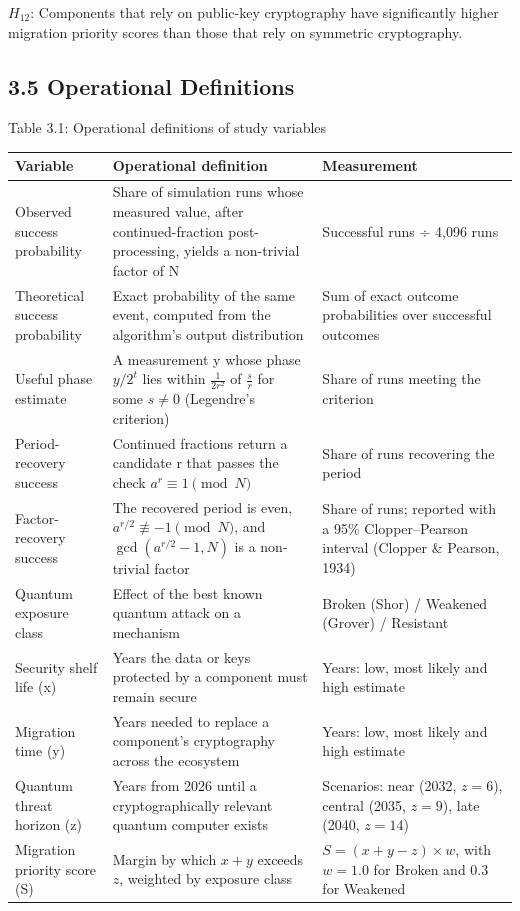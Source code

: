 \documentclass[12pt,oneside]{report}
\begin{document}
$H_{12}$: Components that rely on public-key cryptography have significantly higher migration priority scores than those that rely on symmetric cryptography.
\par

\subsection*{3.5 Operational Definitions}

\label{tab:3.1}Table 3.1: Operational definitions of study variables
\par

\begin{center}\small\begin{tabularx}{\textwidth}{|W|W|W|}\hline
Variable & Operational definition & Measurement \\\hline
Observed success probability & Share of simulation runs whose measured value, after continued-fraction post-processing, yields a non-trivial factor of N & Successful runs ÷ 4,096 runs \\\hline
Theoretical success probability & Exact probability of the same event, computed from the algorithm's output distribution & Sum of exact outcome probabilities over successful outcomes \\\hline
Useful phase estimate & A measurement y whose phase $y/2^{t}$ lies within $\frac{1}{2r^{2}}$ of $\frac{s}{r}$ for some $s \neq 0$ (Legendre's criterion) & Share of runs meeting the criterion \\\hline
Period-recovery success & Continued fractions return a candidate r that passes the check $a^{r} \equiv 1 \pmod{N}$ & Share of runs recovering the period \\\hline
Factor-recovery success & The recovered period is even, $a^{r/2} \not\equiv -1 \pmod{N}$, and $\gcd(a^{r/2} - 1, N)$ is a non-trivial factor & Share of runs; reported with a 95\% Clopper–Pearson interval (Clopper \& Pearson, 1934) \\\hline
Quantum exposure class & Effect of the best known quantum attack on a mechanism & Broken (Shor) / Weakened (Grover) / Resistant \\\hline
Security shelf life (x) & Years the data or keys protected by a component must remain secure & Years: low, most likely and high estimate \\\hline
Migration time (y) & Years needed to replace a component's cryptography across the ecosystem & Years: low, most likely and high estimate \\\hline
Quantum threat horizon (z) & Years from 2026 until a cryptographically relevant quantum computer exists & Scenarios: near (2032, $z = 6$), central (2035, $z = 9$), late (2040, $z = 14$) \\\hline
Migration priority score (S) & Margin by which $x + y$ exceeds $z$, weighted by exposure class & $S = (x + y - z) \times w$, with $w = 1.0$ for Broken and $0.3$ for Weakened \\\hline\end{tabularx}\end{center}
\end{document}
